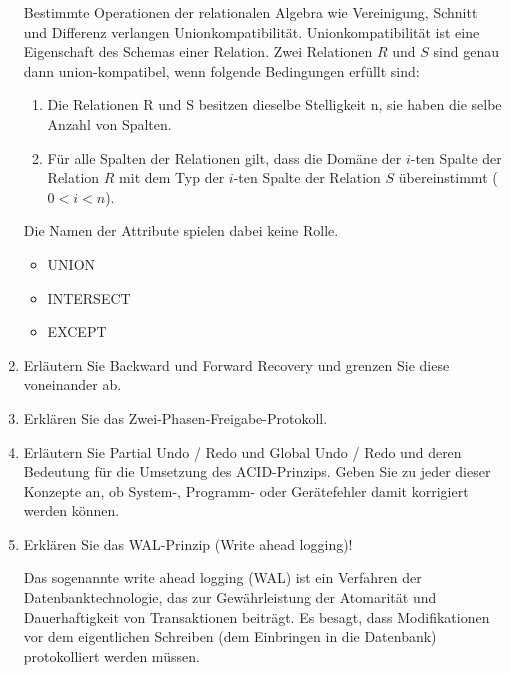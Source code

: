 \documentclass{lehramt-informatik-aufgabe}
\begin{document}
\begin{enumerate}
\begin{liAntwort}
Bestimmte Operationen der relationalen Algebra wie Vereinigung,
Schnitt und Differenz verlangen Unionkompatibilität.
Unionkompatibilität ist eine Eigenschaft des Schemas einer Relation.
Zwei Relationen $R$ und $S$ sind genau dann union-kompatibel, wenn
folgende Bedingungen erfüllt sind:

\begin{enumerate}
\item Die Relationen R und S besitzen dieselbe Stelligkeit n, \dh sie
haben die selbe Anzahl von Spalten.

\item Für alle Spalten der Relationen gilt, dass die Domäne der $i$-ten
Spalte der Relation $R$ mit dem Typ der $i$-ten Spalte der Relation $S$
übereinstimmt ($0 < i < n$).
\end{enumerate}

Die Namen der Attribute spielen dabei keine Rolle.


\begin{itemize}
\item UNION
\item INTERSECT
\item EXCEPT
\end{itemize}
\end{liAntwort}

%

\item Erläutern Sie Backward und Forward Recovery und grenzen Sie diese
voneinander ab.

%

\item Erklären Sie das Zwei-Phasen-Freigabe-Protokoll.

%

\item Erläutern Sie Partial Undo / Redo und Global Undo / Redo und deren
Bedeutung für die Umsetzung des ACID-Prinzips. Geben Sie zu jeder dieser
Konzepte an, ob System-, Programm- oder Gerätefehler damit korrigiert
werden können.

%

\item Erklären Sie das WAL-Prinzip (Write ahead logging)!

\begin{liAntwort}
Das sogenannte write ahead logging (WAL) ist ein Verfahren der
Datenbanktechnologie, das zur Gewährleistung der Atomarität und
Dauerhaftigkeit von Transaktionen beiträgt. Es besagt, dass
Modifikationen vor dem eigentlichen Schreiben (dem Einbringen in die
Datenbank) protokolliert werden müssen.


\end{liAntwort}
\end{enumerate}
\end{document}
